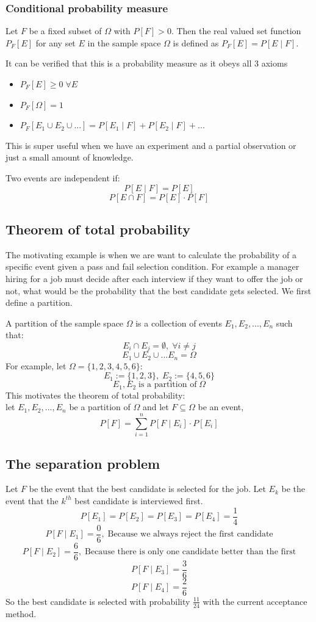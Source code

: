 \documentclass[12pt]{article}
\begin{document}
\subsubsection*{Conditional probability measure}
Let \(F\) be a fixed subset of \(\Omega\) with \(P[F]>0\). Then the real valued set function \(P_F[E]\) for any set \(E\) in the sample space \(\Omega\) is defined as \(P_F[E]=P[E\mid F]\).

It can be verified that this is a probability measure as it obeys all 3 axioms
\begin{itemize}
    \item \(P_F[E]\geq 0\;\forall E\)
    \item \(P_F[\Omega]=1\)
    \item \(P_F[E_1\cup E_2\cup ...]=P[E_1\mid F]+P[E_2\mid F]+...\)
\end{itemize}
This is super useful when we have an experiment and a partial observation or just a small amount of knowledge.

Two events are independent if:
\[P[E\mid F]=P[E]\]
\[P[E\cap F]=P[E]\cdot P[F]\]
\subsection*{Theorem of total probability}
The motivating example is when we are want to calculate the probability of a specific event given a pass and fail selection condition. For example a manager hiring for a job must decide after each interview if they want to offer the job or not, what would be the probability that the best candidate gets selected. We first define a partition.

A partition of the sample space \(\Omega\) is a collection of events \(E_1,E_2,...,E_n\) such that:
\[E_i\cap E_j=\emptyset,\;\forall i\ne j\]
\[E_1\cup E_2\cup ...E_n=\Omega\]
For example, let \(\Omega=\{1,2,3,4,5,6\}\):
\[E_1:=\{1,2,3\},\; E_2:=\{4,5,6\}\]
\[E_1,E_2\;\text{is a partition of}\;\Omega\]
This motivates the theorem of total probability:
\\
let \(E_1,E_2,...,E_n\) be a partition of \(\Omega\) and let \(F\subseteq\Omega\) be an event,
\[P[F]=\sum_{i=1}^nP[F\mid E_i]\cdot P[E_i]\]
\subsection*{The separation problem}
Let \(F\) be the event that the best candidate is selected for the job. Let \(E_k\) be the event that the \(k^{th}\) best candidate is interviewed first.
\[P[E_1]=P[E_2]=P[E_3]=P[E_4]=\frac{1}{4}\]
\[P[F\mid E_1]=\frac{0}{6},\;\text{Because we always reject the first candidate}\]
\[P[F\mid E_2]=\frac{6}{6},\;\text{Because there is only one candidate better than the first}\]
\[P[F\mid E_3]=\frac{3}{6}\]
\[P[F\mid E_4]=\frac{2}{6}\]
So the best candidate is selected with probability \(\frac{11}{24}\) with the current acceptance method.
\end{document}
